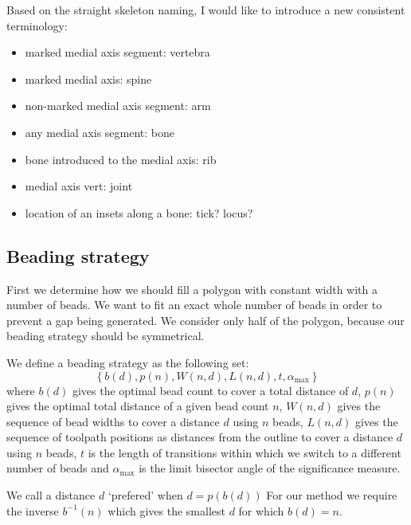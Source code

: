 Based on the straight skeleton naming, I would like to introduce a new consistent terminology:
\begin{itemize}
\item marked medial axis segment: vertebra
\item marked medial axis: spine
\item non-marked medial axis segment: arm
\item any medial axis segment: bone
\item bone introduced to the medial axis: rib
\item medial axis vert: joint
\item location of an insets along a bone: tick? locus?
\end{itemize}












\subsection{Beading strategy}
First we determine how we should fill a 	polygon with constant width with a number of beads.
We want to fit an exact whole number of beads in order to prevent a gap being generated.
We consider only half of the polygon, because our beading strategy should be symmetrical.

We define a beading strategy as the following set:
$$
\left\{ b(d), p(n), W(n, d), L(n, d), t, \alpha_{\text{max}} \right\}
$$
where
$b(d)$ gives the optimal bead count to cover a total distance of $d$,
$p(n)$ gives the optimal total distance of a given bead count $n$,
$W(n, d)$ gives the sequence of bead widths to cover a distance $d$ using $n$ beads,
$L(n, d)$ gives the sequence of toolpath positions as distances from the outline to cover a distance $d$ using $n$ beads,
$t$ is the length of transitions within which we switch to a different number of beads
and
$\alpha_{\text{max}}$ is the limit bisector angle of the significance measure.


We call a distance $d$ `prefered' when $d = p(b(d))$
For our method we require the inverse $b^{-1}(n)$ which gives the smallest $d$ for which $b(d) = n$.

